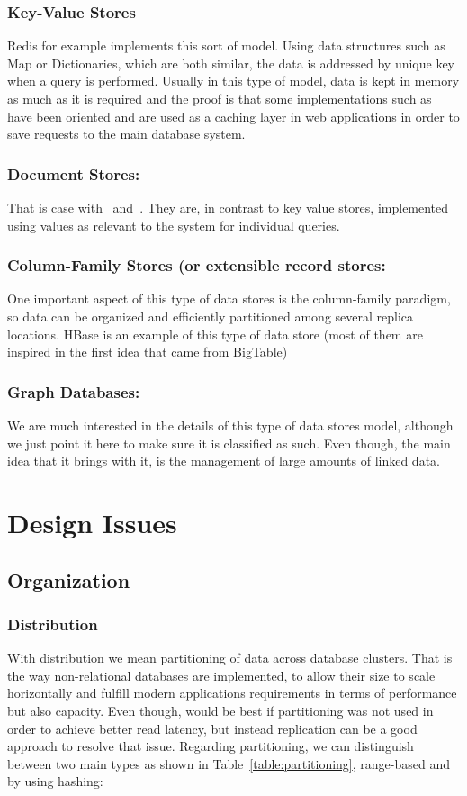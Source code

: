 	\subsubsection{Key-Value Stores}
	Redis for example implements this sort of model. Using data structures such as Map or Dictionaries, which are both similar, the data is addressed by unique key when a query is performed. Usually in this type of model, data is kept in memory as much as it is required and the proof is that some implementations such as~\cite{Memcached} have been oriented and are used as a caching layer in web applications in order to save requests to the main database system.
	\subsubsection{Document Stores:}
	That is case with~\cite{Mongodb} and~\cite{Couchdb}. They are, in contrast to key value stores, implemented using values as relevant to the system for individual queries.
	\subsubsection{Column-Family Stores (or extensible record stores:}
	One important aspect of this type of data stores is the column-family paradigm, so data can be organized and efficiently partitioned among several replica locations. HBase is an example of this type of data store (most of them are inspired in the first idea that came from BigTable)
	\subsubsection{Graph Databases:}
	We are much interested in the details of this type of data stores model, although we just point it here to make sure it is classified as such. Even though, the main idea that it brings with it, is the management of large amounts of linked data.

\section{Design Issues}
	
\subsection{Organization}
	\subsubsection{Distribution}
	With distribution we mean partitioning of data across database clusters. That is the way non-relational databases are implemented, to allow their size to scale horizontally and fulfill modern applications requirements in terms of performance but also capacity. Even though, would be best if partitioning was not used in order to achieve better read latency, but instead replication can be a good approach to resolve that issue. Regarding partitioning, we can distinguish between two main types as shown in Table~\ref{table:partitioning}, range-based and by using hashing:
	
